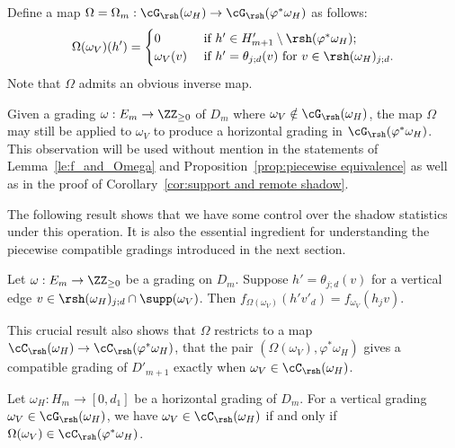 Define a map $\Omega=\Omega_m:\cG_{\rsh}(\omega_H)\to\cG_{\rsh}(\varphi^*\omega_H)$ as follows:
\[\Omega(\omega_V)(h')=
 \begin{cases}
 0 & \text{ if $h'\in H'_{m+1}\setminus\rsh(\varphi^*\omega_H)$;}\\
 \omega_V(v) & \text{ if $h'=\theta_{j;d}(v)$ for $v\in\rsh(\omega_H)_{j;d}$.}
 \end{cases}\]
Note that $\Omega$ admits an obvious inverse map. 
\begin{remark}
 Given a grading $\omega:E_m\to\ZZ_{\ge0}$ of $D_m$ where $\omega_V\notin\cG_{\rsh}(\omega_H)$, the map $\Omega$ may still be applied to $\omega_V$ to produce a horizontal grading in $\cG_{\rsh}(\varphi^*\omega_H)$. 
 This observation will be used without mention in the statements of Lemma~\ref{le:f_and_Omega} and Proposition~\ref{prop:piecewise equivalence} as well as in the proof of Corollary~\ref{cor:support and remote shadow}.
\end{remark}

The following result shows that we have some control over the shadow statistics under this operation.
It is also the essential ingredient for understanding the piecewise compatible gradings introduced in the next section.
\begin{lemma}
 \label{le:f_and_Omega}
 Let $\omega:E_m\to\ZZ_{\ge0}$ be a grading on $D_m$.
 Suppose $h'=\theta_{j;d}(v)$ for a vertical edge $v\in\rsh(\omega_H)_{j;d}\cap\supp(\omega_V)$. Then $f_{\Omega(\omega_V)}(h'v'_d)=f_{\omega_V}(h_jv)$.
\end{lemma}
This crucial result also shows that $\Omega$ restricts to a map $\cC_{\rsh}(\omega_H)\to\cC_{\rsh}(\varphi^*\omega_H)$, \ie that the pair $(\Omega(\omega_V),\varphi^*\omega_H)$ gives a compatible grading of $D'_{m+1}$ exactly when $\omega_V\in\cC_{\rsh}(\omega_H)$.
\begin{proposition}
 \label{prop:compatibility equivalence}
 Let $\omega_H:H_m\to[0,d_1]$ be a horizontal grading of $D_m$. 
 For a vertical grading $\omega_V\in\cG_{\rsh}(\omega_H)$, we have $\omega_V\in\cC_{\rsh}(\omega_H)$ if and only if $\Omega(\omega_V)\in\cC_{\rsh}(\varphi^*\omega_H)$.
\end{proposition}

